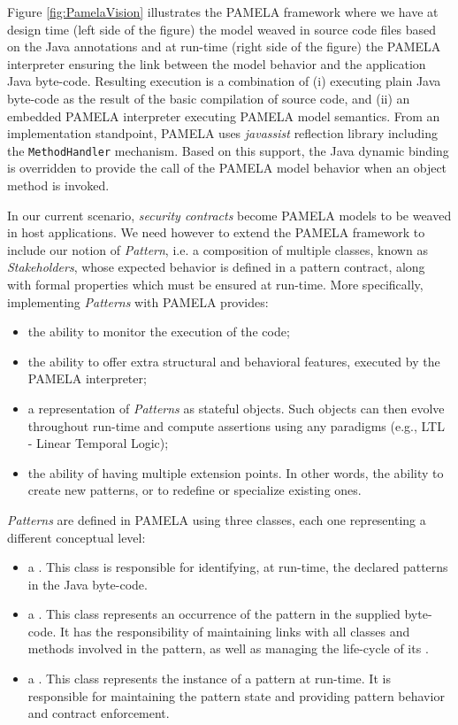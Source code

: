 Figure \ref{fig:PamelaVision} illustrates the PAMELA framework where we have at design time (left side of the figure) the model weaved in source code files based on the Java annotations and at run-time (right side of the figure) the PAMELA interpreter ensuring the link between the model behavior and the application Java byte-code. Resulting execution is a combination of (i) executing plain Java byte-code as the result of the basic compilation of source code, and (ii) an embedded PAMELA interpreter executing PAMELA model semantics. From an implementation standpoint, PAMELA uses \emph{javassist} reflection library including the \texttt{MethodHandler} mechanism. Based on this support, the Java dynamic binding is overridden to provide the call of the PAMELA model behavior when an object method is invoked. 

In our current scenario, \emph{security contracts} become PAMELA models to be weaved in host applications. We need however to extend the PAMELA framework to include our notion of \emph{Pattern}, i.e. a composition of multiple classes, known as \emph{Stakeholders}, whose expected behavior is defined in a pattern contract, along with formal properties which must be ensured at run-time. More specifically, implementing \emph{Patterns} with PAMELA provides:
\begin{itemize}
    \item the ability to monitor the execution of the code;
    \item the ability to offer extra structural and behavioral features, executed by the PAMELA interpreter;
    \item a representation of \emph{Patterns} as stateful objects. Such objects can then evolve throughout run-time and compute assertions using any paradigms (e.g., LTL - Linear Temporal Logic);
    \item the ability of having multiple extension points. In other words, the ability to create new patterns, or to redefine or specialize existing ones.
\end{itemize}

\emph{Patterns} are defined in PAMELA using three classes, each one representing a different conceptual level:
\begin{itemize}
    \item a . This class is responsible for identifying, at run-time, the declared patterns in the Java byte-code.
    \item a . This class represents an occurrence of the pattern in the supplied byte-code. It has the responsibility of maintaining links with all classes and methods involved in the pattern, as well as managing the life-cycle of its .
    \item a . This class represents the instance of a pattern at run-time. It is responsible for maintaining the pattern state and providing pattern behavior and contract enforcement.
\end{itemize}

